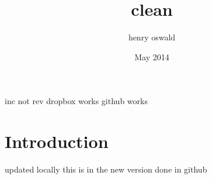 \documentclass{article}
\title{clean}
\author{henry oswald}
\date{May 2014}
\begin{document}
\maketitle
inc not rev
dropbox works
github works
\section{Introduction}
updated locally
this is in the new version 
done in github
\end{document}

